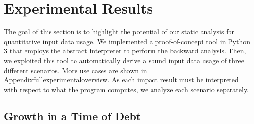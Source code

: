 \section{Experimental Results}
\newcommand*{\x}{\texttt{angle}}
\newcommand*{\y}{\texttt{speed}}
\newcommand*{\z}{\texttt{risk}}


The goal of this section is to highlight the potential of our static analysis for quantitative input data usage.
We implemented a proof-of-concept tool in Python 3 that employs the \interproc{} abstract interpreter to perform the backward analysis.
Then, we exploited this tool to automatically derive a sound input data usage of three different scenarios.
More use cases are shown in~\\Appendixfullexperimentaloverview.
As each impact result must be interpreted with respect to what the program computes, we analyze each scenario separately.

\subsection{Growth in a Time of Debt}


